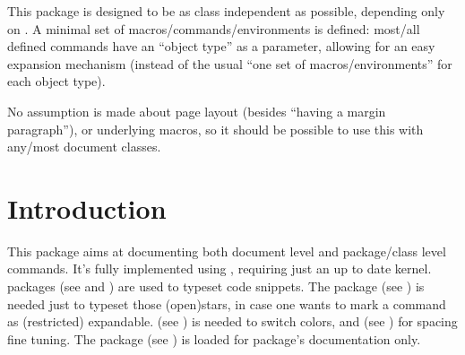\documentclass{article}
\begin{document}




  
\begin{typesetabstract}

This package is designed to be as class independent as possible, depending only on . A minimal set of macros/commands/environments is defined: most/all defined commands have an ``object type'' as a  parameter, allowing for an easy expansion mechanism (instead of the usual ``one set of macros/environments'' for each object type).

No assumption is made about page layout (besides ``having a margin paragraph''),  or underlying macros, so it should be possible to use this with any/most document classes.

\end{typesetabstract}

\tableofcontents

\section{Introduction}


This package aims at documenting both document level and package/class level commands. It's fully implemented using , requiring just an up to date kernel.  packages (see \cite{SCONTENTS} and \cite{listings}) are used to typeset code snippets. 
The package  (see \cite{pifont}) is needed just to typeset those (open)stars, in case one wants to mark a command as (restricted) expandable. 
 (see \cite{xcolor}) is needed to switch colors, and  (see \cite{xpeekahead}) for spacing fine tuning. The package  (see \cite{pkginfograb}) is loaded for package's documentation only.
 
\end{document}
